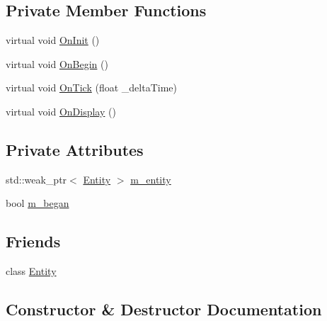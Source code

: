 \subsection*{Private Member Functions}
\begin{DoxyCompactItemize}
\item 
virtual void \mbox{\hyperlink{class_disc___engine_1_1_component_a3e79ad90d53b156d2c1d784c6051b2c5}{On\+Init}} ()
\item 
virtual void \mbox{\hyperlink{class_disc___engine_1_1_component_a2f1df48d7c4dd26ee9560714e962bd21}{On\+Begin}} ()
\item 
virtual void \mbox{\hyperlink{class_disc___engine_1_1_component_a7e322d37c3f5fa0181f2321d08b14527}{On\+Tick}} (float \+\_\+delta\+Time)
\item 
virtual void \mbox{\hyperlink{class_disc___engine_1_1_component_a2ecaa15a2576e4686b25a31cea0fe342}{On\+Display}} ()
\end{DoxyCompactItemize}
\subsection*{Private Attributes}
\begin{DoxyCompactItemize}
\item 
std\+::weak\+\_\+ptr$<$ \mbox{\hyperlink{class_disc___engine_1_1_entity}{Entity}} $>$ \mbox{\hyperlink{class_disc___engine_1_1_component_aebc3183e7720ae37cc56f9d23c88a05f}{m\+\_\+entity}}
\item 
bool \mbox{\hyperlink{class_disc___engine_1_1_component_a93ac80d6d168cb71b3942e5aa01f0177}{m\+\_\+began}}
\end{DoxyCompactItemize}
\subsection*{Friends}
\begin{DoxyCompactItemize}
\item 
class \mbox{\hyperlink{class_disc___engine_1_1_component_a614439ccac0344926adc4c0165d64060}{Entity}}
\end{DoxyCompactItemize}


\subsection{Constructor \& Destructor Documentation}
\mbox{\label{class_disc___engine_1_1_component_ab8378fa275af98e568a7e91d33d867af}} 
